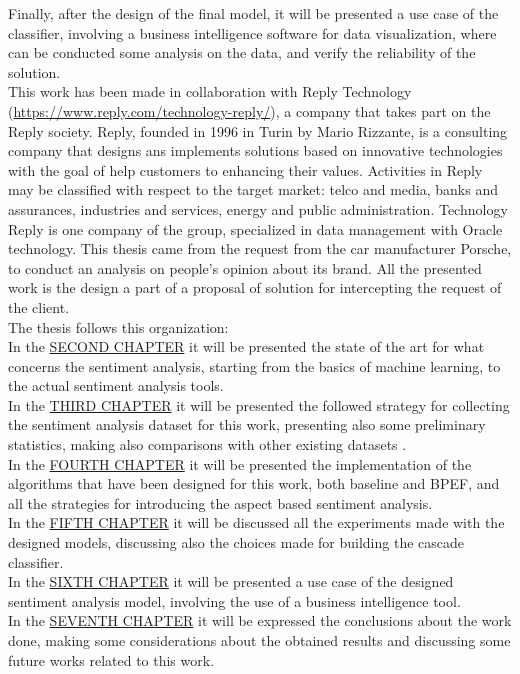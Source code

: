 Finally, after the design of the final model, it will be presented a use case of the classifier, involving a business intelligence software for data visualization, where can be conducted some analysis on the data, and verify the reliability of the solution.\\
This work has been made in collaboration with Reply Technology (\url{https://www.reply.com/technology-reply/}), a company that takes part on the Reply society. Reply, founded in 1996 in Turin by Mario Rizzante, is a consulting company that designs ans implements solutions based on innovative technologies with the goal of help customers to enhancing their values. Activities in Reply may be classified with respect to the target market: telco and media, banks and assurances, industries and services, energy and public administration. Technology Reply is one company of the group, specialized in data management with Oracle technology. This thesis came from the request from the car manufacturer Porsche, to conduct an analysis on people's opinion about its brand. All the presented work is the design a part of a proposal of solution for intercepting the request of the client.\\
The thesis follows this organization:\\
In the \hyperref[state-of-the-art]{\textcolor[RGB]{35,103,148}{SECOND CHAPTER}} it will be presented the state of the art for what concerns the sentiment analysis, starting from the basics of machine learning, to the actual sentiment analysis tools.\\
In the \hyperref[dataset]{\textcolor[RGB]{35,103,148}{THIRD CHAPTER}} it will be presented the followed strategy for collecting the sentiment analysis dataset for this work, presenting also some preliminary statistics, making also comparisons with other existing datasets .\\
In the \hyperref[algorithms]{\textcolor[RGB]{35,103,148}{FOURTH CHAPTER}} it will be presented the implementation of the algorithms that have been designed for this work, both baseline and \ac{BPEF}, and all the strategies for introducing the aspect based sentiment analysis.\\
In the \hyperref[experiments]{\textcolor[RGB]{35,103,148}{FIFTH CHAPTER}} it will be discussed all the experiments made with the designed models, discussing also the choices made for building the cascade classifier.\\
In the \hyperref[industrial-use-case]{\textcolor[RGB]{35,103,148}{SIXTH CHAPTER}} it will be presented a use case of the designed sentiment analysis model, involving the use of a business intelligence tool.\\
In the \hyperref[conclusion]{\textcolor[RGB]{35,103,148}{SEVENTH CHAPTER}} it will be expressed the conclusions about the work done, making some considerations about the obtained results and discussing some future works related to this work.\\

